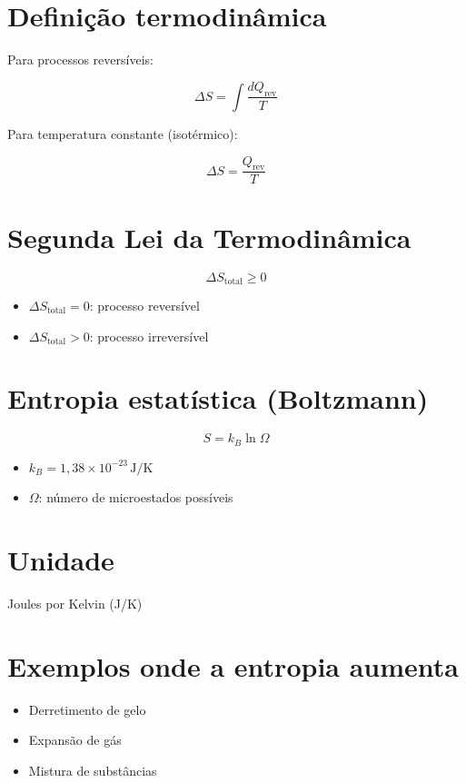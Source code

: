 \documentclass[a4paper,12pt]{article}
\begin{document}
\section*{Definição termodinâmica}
Para processos reversíveis:

\[
\Delta S = \int \frac{dQ_{\text{rev}}}{T}
\]

Para temperatura constante (isotérmico):

\[
\Delta S = \frac{Q_{\text{rev}}}{T}
\]

\section*{Segunda Lei da Termodinâmica}

\[
\Delta S_{\text{total}} \geq 0
\]

\begin{itemize}
  \item \( \Delta S_{\text{total}} = 0 \): processo reversível
  \item \( \Delta S_{\text{total}} > 0 \): processo irreversível
\end{itemize}

\section*{Entropia estatística (Boltzmann)}

\[
S = k_B \ln \Omega
\]

\begin{itemize}
  \item \( k_B = 1{,}38 \times 10^{-23} \, \text{J/K} \)
  \item \( \Omega \): número de microestados possíveis
\end{itemize}

\section*{Unidade}
Joules por Kelvin (J/K)

\section*{Exemplos onde a entropia aumenta}
\begin{itemize}
  \item Derretimento de gelo
  \item Expansão de gás
  \item Mistura de substâncias
\end{itemize}
\end{document}
